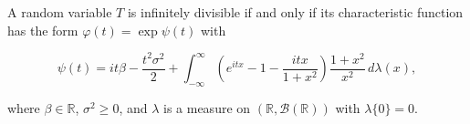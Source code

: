 A random variable $T$ is infinitely divisible if and only if its characteristic function has the form $\varphi(t) = \exp \psi(t)$ with

$$\psi(t) = it\beta - \frac{t^2\sigma^2}{2} + \int_{-\infty}^{\infty} \left( e^{itx} - 1 - \frac{itx}{1+x^2} \right) \frac{1+x^2}{x^2} \, d\lambda(x),$$

where $\beta \in \mathbb{R}$, $\sigma^2 \geq 0$, and $\lambda$ is a measure on $(\mathbb{R}, \mathcal{B}(\mathbb{R}))$ with $\lambda\{0\} = 0$.
